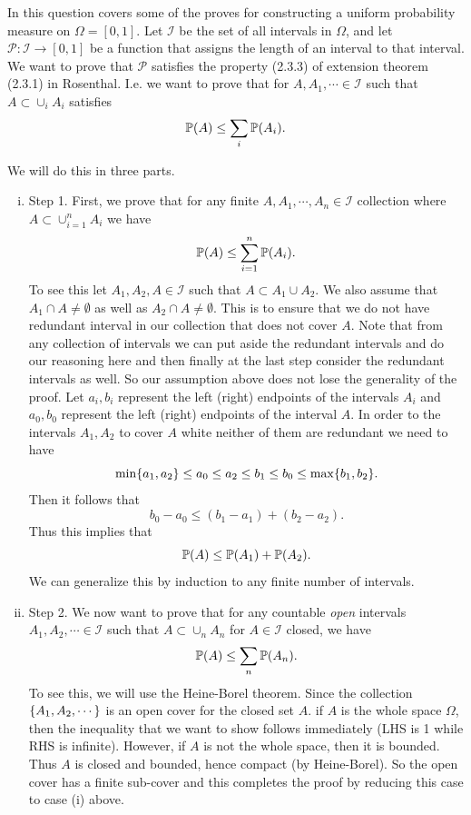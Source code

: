 \begin{problem}
	In this question covers some of the proves for constructing a uniform probability measure on $ \Omega = [0,1] $. Let $ \mathcal{I} $ be the set of all intervals in $ \Omega $, and let $ \mathcal{P}:\mathcal{I} \to [0,1] $ be a function that assigns the length of an interval to that interval. We want to prove that $ \mathcal{P} $ satisfies the property (2.3.3) of extension theorem (2.3.1) in Rosenthal. I.e. we want to prove that for $ A, A_1,\cdots \in \mathcal{I} $ such that $ A \subset \cup_{i}A_i$ satisfies 
	\[ \mathbb{P}(A) \leq \sum_{i} \mathbb{P}(A_i). \]
\end{problem}
\begin{solution}
	We will do this in three parts. 
	\begin{enumerate}[(i)]
		\item Step 1. First, we prove that for any finite $ A, A_1,\cdots,A_n \in\mathcal{I} $ collection where $ A \subset \cup_{i=1}^{n} A_i $ we have
		\[ \mathbb{P}(A) \leq \sum_{i=1}^{n} \mathbb{P}(A_i). \]
		To see this let $ A_1,A_2, A \in \mathcal{I} $ such that $ A \subset A_1 \cup A_2 $. We also assume that $ A_1\cap A \neq \emptyset $ as well as $ A_2 \cap A \neq \emptyset $. This is to ensure that we do not have redundant interval in our collection that does not cover $ A $. Note that from any collection of intervals we can put aside the redundant intervals and do our reasoning here and then finally at the last step consider the redundant intervals as well. So our assumption above does not lose the generality of the proof. Let $ a_i, b_i $ represent the left (right) endpoints of the intervals $ A_i $ and $ a_0,b_0 $ represent the left (right) endpoints of the interval $ A $. In order to the intervals $ A_1, A_2 $ to cover $ A $ white neither of them are redundant we need to have
		\[ \min\{a_1,a_2\} \leq a_0 \leq a_2 \leq b_1 \leq b_0 \leq \max\{b_1,b_2\}. \]
		Then it follows that 
		\[ b_0 - a_0 \leq (b_1 - a_1) + (b_2 - a_2). \]
		Thus this implies that 
		\[ \mathbb{P}(A) \leq \mathbb{P}(A_1) + \mathbb{P}(A_2). \]
		We can generalize this by induction to any finite number of intervals.
		\item Step 2. We now want to prove that for any countable \emph{open} intervals $ A_1,A_2,\cdots \in \mathcal{I} $ such that $ A \subset \cup_n A_n $ for $ A \in \mathcal{I} $ closed, we have
		\[ \mathbb{P}(A) \leq \sum_n \mathbb{P}(A_n). \]
		To see this, we will use the Heine-Borel theorem. Since the collection $ \{A_1,A_2,\cdots\} $ is an open cover for the closed set $ A $. if $ A $ is the whole space $ \Omega $, then the inequality that we want to show follows immediately (LHS is 1 while RHS is infinite). However, if $ A $ is not the whole space, then it is bounded. Thus $ A $ is closed and bounded, hence compact (by Heine-Borel). So the open cover has a finite sub-cover and this completes the proof by reducing this case to case (i) above.

\end{enumerate}
\end{solution}
